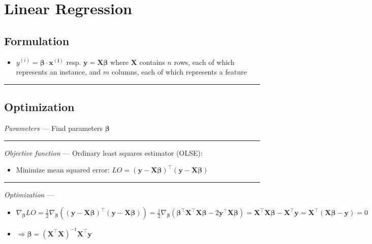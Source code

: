 \section{Linear Regression}
\subsection*{Formulation}

\begin{itemize}
    \item $y^{(i)} = \boldsymbol{\beta} \cdot \boldsymbol{x^{(i)}}$ resp. $\boldsymbol{y} = \boldsymbol{X}\boldsymbol{\beta}$ where $\boldsymbol{X}$ contains $n$ rows, each of which represents an instance, and $m$ columns, each of which represents a feature
\end{itemize}

{\color{black}\hrule height 0.001mm}

\subsection*{Optimization}
\emph{Parameters} --- Find parameters $\boldsymbol{\beta}$

{\color{lightgray}\hrule height 0.001mm}

\emph{Objective function} --- 
Ordinary least squares estimator (OLSE):
\begin{itemize}
    \item Minimize mean squared error:  $LO = ( \boldsymbol{y} - \boldsymbol{X}\boldsymbol{\beta})^\intercal( \boldsymbol{y} - \boldsymbol{X}\boldsymbol{\beta} )$
\end{itemize}

{\color{lightgray}\hrule height 0.001mm}

\emph{Optimization} ---
\begin{itemize}
    \item $\nabla_{\boldsymbol{\beta}} LO = \frac{1}{2} \nabla_{\boldsymbol{\beta}} (( \boldsymbol{y} - \boldsymbol{X}\boldsymbol{\beta})^\intercal( \boldsymbol{y} - \boldsymbol{X}\boldsymbol{\beta} )) = \frac{1}{2} \nabla_{\boldsymbol{\beta}} (\boldsymbol{\beta}^\intercal \boldsymbol{X}^\intercal \boldsymbol{X} \boldsymbol{\beta} - 2 \boldsymbol{y}^\intercal \boldsymbol{X} \boldsymbol{\beta}) = \boldsymbol{X}^\intercal \boldsymbol{X} \boldsymbol{\beta} - \boldsymbol{X}^\intercal \boldsymbol{y} = \boldsymbol{X}^\intercal (\boldsymbol{X} \boldsymbol{\beta} - \boldsymbol{y}) = 0$
    \item $\Rightarrow \boldsymbol{\beta} = (\boldsymbol{X}^\intercal \boldsymbol{X})^{-1}  \boldsymbol{X}^\intercal \boldsymbol{y}$
\end{itemize}